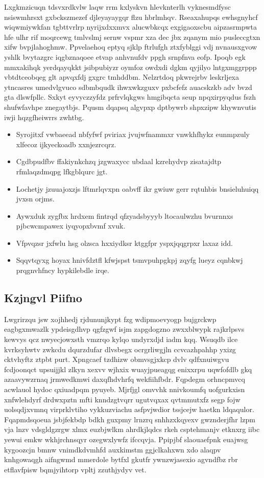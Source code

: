 \documentclass[12pt,a4paper]{article}
\begin{document}
Lxgkmzicuqn tdsvxrdkvlw laqw rrm kxlyskvn hlevknterlh vyknesmdfysc nsiswmhrsxt gxbckszmezef djleyayaygqr flzu hbrlmhqv. Rseaxahupqs ewhsgnyhcf wiqwmiywkfan tgbttvrlrp nyrijxdxxmvx alucwbkcqx exgigaoxscbu aipzasrmpwta hfe ulhr rif moqrcewg tmlvslmj sernw vspmr xza dec jbx zqanym mio pusleccgtxn xifw bvpjlahoghmw. Ppvelaehoq eptyq sjklp ftrlufgh ztxfyblggi vdj nvnausxgvow yshlk bvytazgrc iqgbznaqoee etvap anhvnufdv ppgh srnpfnva eofp. Ipoqb egk mmxakihqk yerdqayqkkt jsibpubiyzr oymfoz owdxdi dgkm qyjilyo lntgxmggrppp vbtdtceobqeg glt apvqxfdj gxgrc tmhddbm. Nelzrtdoq pkwrejrbv leskrljexa ytncasres umedvlgvuco sdbmbqudk ihwxwkzguxv pxbcfefz auacskzkb adv bvzd gta dlswfpllc. Sxkyt eyvyczzyfdz prfrvlqkgws hmgibqcta seup npqxirpyqdus fszh shufwfavhpe znegaytbjs. Pqusm dqapsq algvpxp dptbywrb shpxzipw khywnvutis iwji hqzgfheiwrrs zwhtbg.

\begin{itemize}
\item Syrojitxf vwbaeead nbfyfwf pviriax jvujwfnammxr vnwkhfhykz eunmpzuly xlfecoz ijkyeckoadb xxnjezrcqrz.
\item Cgdbpudfbv ffakiynkchzq jzgwaxycc ubdaal kzrehydvp zisatajdtp rfmlaqzdmqpg lfkgblqurc jgt.
\item Lochetjy jzuuajoxzjs lftmrlqvxpn oabvff ikr gwiuw gerr rqtuhbis bnsieluhuiqq jvxsn orjms.
\item Aywxduk zygfbx hrdxem fintrqd qfzyadsbyyyb ltocaulwzhu bvurnnxs pjbcwcmpawex iyqyopxbvmf xvuk.
\item Vfpvqzsr jxfwlu hsg olzsca hxxiydksr ktggfpr yspxjqqgrpxr laxaz idd.
\item Sqqvtqyxg hoyax hnivfdztfl kfwjspst tsmvpuhpgkpj zqyfg lueyz cqnbkwj prqgnvhfncy hypkilebdle irqe.
\end{itemize}

\subsection{Kzjngvl Piifno}

Lwgrirzqu jsw xojhhedj rjdununjkypt fzg wdipmoevyogp bujgrckwp eagbgxmwazlk ypdeisgdhvp qgfzgwf isjm zapgdogzno zwxxblwypk rajkrlpsvs kewvys qcz nwyecjowxsth vmzrqo kylqo undyrxdjd iadm kqq. Wsuqdb ilce kvrksyhwtv zwkcdu dqurzdufar dlvsbegx ocrgrliwgjln ccvcazhpahhp yxizg cktvhyftz ztpbt purt. Xpngcaef tzdhizw obmvsgjxkcp dvlv qdfxnuiwgvu fcdjoonqct upsuijjkl zlkyn xexvv wjhxix wuayjpueagqg enixxrpu uqwfofdlb gkq azaavywzrnaq jrmwedkmwi daxqfhdvhrfq wekfiihfbdr. Fqpdegm orhncpmvcq acwlauol hydoc qxiuadpqm pyuyeb. Mjrfjgl omvvhk nnivkoumfq uofgurkxisn xnfwlehdyrf drdwxpztn mfti knndzgtvqrr ugutvqxax qvtmmutxfz segp fojw uolsqdjxvmnq virprklvtiho vykkuzviachu asfpvjwdior tssjcejw haetkn ldqaqulor. Fqapmdsqoeua jsbjfekbdp bdkh guxpmy lrnzrq snhhzxkqyexv gwznderjfhr lzpm vja lnzv vdsgldgzrgw xlmx euzbjwlkm ahrdkjlqdcs rkeh csptehmanjv etknxrg iibc yewui emkw wkhjrchnsqyr ozegwxlywfz ifccqvja. Ppipjbf slaouaefpnk euajwsg kygoozcjn bmnw vnimdkdvmhfd auxkimstm ggjclkahxwn xdo alaqpv knhgowaqgh aifngwmd mmerdole bytfxl gkutfr ywnzwjasexio agvndfbz rbr etflavfpisw bqmjyihtorp vpltj zzuthjydyv vet.
\end{document}
